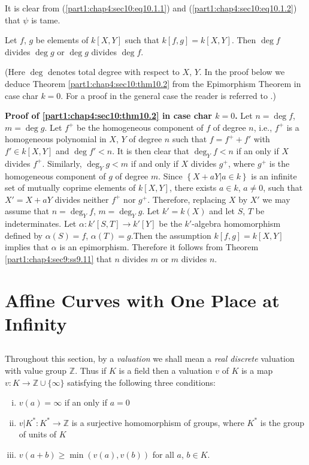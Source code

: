 It is clear from (\ref{part1:chap4:sec10:eq10.1.1}) and (\ref{part1:chap4:sec10:eq10.1.2}) that $\psi$ is tame.


\setcounter{thm}{1}
\begin{thm}\label{part1:chap4:sec10:thm10.2}
  Let $f$, $g$ be elements of $k[X, Y]$ such that $k[f, g]= k[X, Y]$. Then $\deg f$ divides $\deg g$ or $\deg g$ divides $\deg f$.
\end{thm}

(Here $\deg$ denotes total degree with respect to $X$, $Y$. In the
proof below we deduce Theorem \ref{part1:chap4:sec10:thm10.2} from the
Epimorphism Theorem in case char $k=0$. For a proof in the general
case the reader is referred to \cite{5}.) 

\medskip
\noindent \textbf{Proof of \ref{part1:chap4:sec10:thm10.2} in case
  char $k=0$.} Let $n = \deg f$, $m = \deg g$. Let $f^+$ be the
homogeneous component of $f$ of degree $n$, i.e., $f^+$ is a
homogeneous polynomial in $X$, $Y$ of degree $n$ such that $f= f^+ + f'$
with $f' \in k [X, Y]$ and $\deg f' < n$. It is then clear that
$\deg_Y f< n$ if an only if $X$ divides $f^+$. Similarly, $\deg_Y g <
m$ if and only if $X$ divides $g^+$, where $g^+$ is the homogeneous
component of $g$ of degree $m$. Since $\left\{ X + aY\Big| a \in k
\right\}$ is an infinite set of mutually coprime elements of $k[X,
  Y]$, there exists $a \in k$, $a \neq 0$, such that $X'= X + aY$
divides neither $f^+$ nor $g^+$. Therefore, replacing $X$ by $X'$ we
may assume that $n= \deg_Y f$, $m=\deg_Y g$. Let $k' = k(X)$ and let
$S$, $T$ be indeterminates. Let $\alpha: k' [S, T] \to k' [Y]$ be the
$k'$-algebra homomorphism defined by $\alpha (S) =f$, $\alpha (T)
=g$.\pageoriginale Then the assumption $k[f, g]= k[X, Y]$ implies that $\alpha$ is
an epimorphism. Therefore it follows from Theorem
\ref{part1:chap4:sec9:ss9.11} that $n$ divides $m$ or $m$ divides $n$.

\section{Affine Curves with One Place at  Infinity}\label{part1:chap4:sec11}

\subsection{}\label{part1:chap4:sec11:ss11.1}

Throughout this section, by a {\em valuation} we shall mean a {\em
  real discrete} valuation with value group $\mathbb{Z}$. Thus if $K$
is a field then a valuation $v$ of $K$ is a map $v:K \to \mathbb{Z} \cup
\{ \infty \}$ satisfying the following three conditions: 
\begin{enumerate}[(i)]
\item $v(a)= \infty$ if an only if $a=0$

\item $v | K^*: K^* \to \mathbb{Z}$ is a surjective homomorphism of
  groups, where $K^*$ is the group of units of $K$
\item $v(a+b) \geq \min (v(a), v(b))$ for all $a$, $b \in K$.
\end{enumerate}

